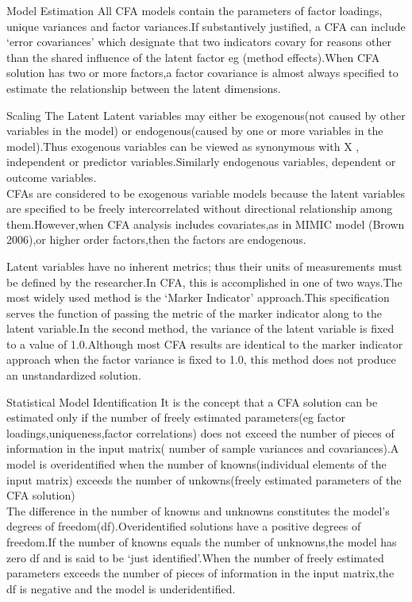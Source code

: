 \documentclass{beamer}
\begin{document}
\begin{frame}
{Model Estimation}
All CFA models contain the parameters of factor loadings, unique variances and factor variances.If substantively justified, a CFA can include ‘error covariances’ which designate that two indicators  covary for reasons other than the shared influence of the latent factor eg (method effects).When CFA solution has two or more factors,a factor covariance is almost always specified to estimate the relationship between the latent dimensions.
\end{frame}
\begin{frame}
{Scaling The Latent}
Latent variables may either be exogenous(not caused by other variables in the model) or endogenous(caused by one or more variables in the model).Thus exogenous variables can be viewed as synonymous with X , independent or predictor variables.Similarly endogenous variables, dependent or outcome variables.\\
\noindent CFAs are considered to be exogenous variable models because the latent variables are specified to be freely intercorrelated without directional relationship among them.However,when CFA analysis includes covariates,as in MIMIC model (Brown 2006),or higher order factors,then the factors are endogenous.\\
\end{frame}
\begin{frame}
\noindent Latent variables have no inherent metrics; thus their units of measurements must be defined by the researcher.In CFA, this is accomplished in one of two ways.The most widely used method is the ‘Marker Indicator’ approach.This specification serves the function of passing the metric of the marker indicator along to the latent variable.In the second method, the variance of the latent variable is fixed to a value of 1.0.Although most CFA results are identical to the marker indicator approach when the factor variance is fixed to 1.0, this method does not produce an unstandardized solution.
\end{frame}
\begin{frame}
{Statistical Model Identification}
It is the concept that a CFA solution can be estimated only if the number of freely estimated parameters(eg factor loadings,uniqueness,factor correlations) does not exceed the number of pieces of information in the input matrix( number of sample variances and covariances).A model is overidentified when the number of knowns(individual elements of the input matrix) exceeds the number of unkowns(freely estimated parameters of the CFA solution)\\
The difference in the number of knowns and unknowns constitutes the model’s degrees of freedom(df).Overidentified solutions have a positive degrees of freedom.If the number of knowns equals the number of unknowns,the model has zero df and is said to be ‘just identified’.When the number of freely estimated parameters exceeds the number of pieces of information in the input matrix,the df is negative and the model is underidentified.\\
\end{frame}
\end{document}
